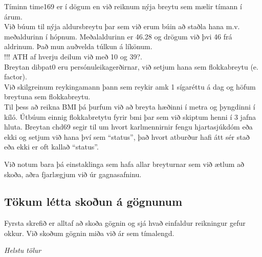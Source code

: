 \documentclass[
]{book}
\begin{document}
Tíminn time169 er í dögum en við reiknum nýja breytu sem mælir tímann í árum.\\
Við búum til nýja aldursbreytu þar sem við erum búin að staðla hana m.v. meðaldurinn í hópnum. Meðalaldurinn er 46.28 og drögum við þvi 46 frá aldrinum. Það mun auðvelda túlkun á líkönum.\\
!!! ATH af hverju deilum við með 10 og 39?.\\
Breytan dibpat0 eru persónuleikagerðirnar, við setjum hana sem flokkabreytu (e. factor).\\
Við skilgreinum reykingamann þann sem reykir amk 1 sígaréttu á dag og höfum breytuna sem flokkabreytu.\\
Til þess að reikna BMI þá þurfum við að breyta hæðinni í metra og þyngdinni í kíló. Útbúum einnig flokkabretytu fyrir bmi þar sem við skiptum henni í 3 jafna hluta.
Breytan chd69 segir til um hvort karlmennirnir fengu hjartasjúkdóm eða ekki og setjum við hana því sem ``status'', það hvort atburður hafi átt sér stað eða ekki er oft kallað ``status''.

Við notum bara þá einstaklinga sem hafa allar breyturnar sem við ætlum að skoða, aðra fjarlægjum við úr gagnasafninu.

\hypertarget{tuxf6kum-luxe9tta-skouxf0un-uxe1-guxf6gnunum}{%
\subsection{Tökum létta skoðun á gögnunum}\label{tuxf6kum-luxe9tta-skouxf0un-uxe1-guxf6gnunum}}

Fyrsta skrefið er alltaf að skoða gögnin og sjá hvað einfaldur reikningur gefur okkur. Við skoðum gögnin miða við ár sem tímalengd.

\emph{Helstu tölur}
\end{document}
